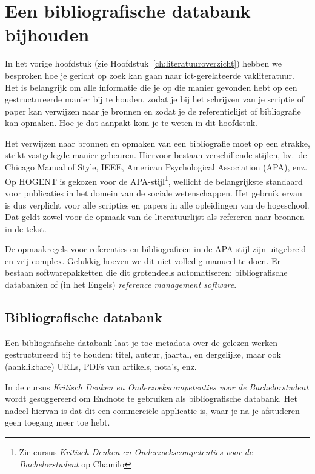 \chapter{Een bibliografische databank bijhouden}%
\label{ch:bibliografie}

In het vorige hoofdstuk (zie Hoofdstuk~\ref{ch:literatuuroverzicht}) hebben we besproken hoe je gericht op zoek kan gaan naar ict-gerelateerde vakliteratuur. Het is belangrijk om alle informatie die je op die manier gevonden hebt op een gestructureerde manier bij te houden, zodat je bij het schrijven van je scriptie of paper kan verwijzen naar je bronnen en zodat je de referentielijst of bibliografie kan opmaken. Hoe je dat aanpakt kom je te weten in dit hoofdstuk.

Het verwijzen naar bronnen en opmaken van een bibliografie moet op een strakke, strikt vastgelegde manier gebeuren. Hiervoor bestaan verschillende stijlen, bv.\ de Chicago Manual of Style, IEEE, American Psychological Association (APA), enz. Op HOGENT is gekozen voor de APA-stijl\footnote{Zie cursus \emph{Kritisch Denken en Onderzoekscompetenties voor de Bachelorstudent} op Chamilo}, wellicht de belangrijkste standaard voor publicaties in het domein van de sociale wetenschappen. Het gebruik ervan is dus verplicht voor alle scripties en papers in alle opleidingen van de hogeschool. Dat geldt zowel voor de opmaak van de literatuurlijst als refereren naar bronnen in de tekst.

De opmaakregels voor referenties en bibliografieën in de APA-stijl zijn uitgebreid en vrij complex. Gelukkig hoeven we dit niet volledig manueel te doen. Er bestaan softwarepakketten die dit grotendeels automatiseren: bibliografische databanken of (in het Engels) \emph{reference management software}.

\section{Bibliografische databank}%
\label{sec:bibliografische-databank}

Een bibliografische databank laat je toe metadata over de gelezen werken gestructureerd bij te houden: titel, auteur, jaartal, en dergelijke, maar ook (aanklikbare) URLs, PDFs van artikels, nota's, enz.

In de cursus \emph{Kritisch Denken en Onderzoekscompetenties voor de Bachelorstudent} wordt gesuggereerd om Endnote te gebruiken als bibliografische databank. Het nadeel hiervan is dat dit een commerciële applicatie is, waar je na je afstuderen geen toegang meer toe hebt.

